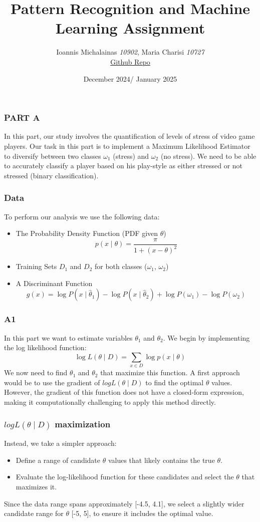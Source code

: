 \documentclass{beamer}
\title{Pattern Recognition and Machine Learning Assignment}
\author{Ioannis Michalainas \textit{10902}, Maria Charisi \textit{10727}\\
    \href{https://github.com/ioannisam/PR-ML}{Github Repo}
}
\date{December 2024/ January 2025}
\begin{document}
\frame{\titlepage}

\begin{frame}


\frametitle{PART A}
In this part, our study involves the quantification of levels of stress of video game players. Our task in this part is to implement a Maximum Likelihood Estimator to diversify between two classes $\omega_1$ (stress) and $\omega_2$ (no stress). We need to be able to accurately classify a player based on his play-style as either stressed or not stressed (binary classification).

\end{frame}

\begin{frame}
\frametitle{Data}

To perform our analysis we use the following data: 
\begin{itemize}
    \item The Probability Density Function (PDF given $\theta$)$$ p(x \mid \theta) = \frac{\pi}{1 + (x - \theta)^2} $$
    \item Training Sets $D_1$ and $D_2$ for both classes ($\omega_1$, $\omega_2$)
    \item A Discriminant Function $$ g(x) = \log P(x \mid \hat{\theta}_1) - \log P(x \mid \hat{\theta}_2) + \log P(\omega_1) - \log P(\omega_2) $$
\end{itemize}
\end{frame}

\begin{frame}
\frametitle{A1}
In this part we want to estimate variables $\theta_1$ and $\theta_2$.
We begin by implementing the log likelihood function:
$$
\log L(\theta \mid D) = \sum_{x \in D} \log p(x \mid \theta)
$$
We now need to find $\theta_1$ and $\theta_2$ that maximize this function. A first approach would be to use the gradient of $log L(\theta \mid D)$ to find the optimal $\theta$ values. However, the gradient of this function does not have a closed-form expression, making it computationally challenging to apply this method directly.
\end{frame}

\begin{frame}
\frametitle{$log L(\theta \mid D)$ maximization}
Instead, we take a simpler approach:
\begin{itemize}
    \item Define a range of candidate $\theta$ values that likely contains the true $\theta$.
    \item Evaluate the log-likelihood function for these candidates and select the $\theta$ that maximizes it.
\end{itemize}
Since the data range spans approximately [-4.5, 4.1], we select a slightly wider candidate range for $\theta$ [-5, 5], to ensure it includes the optimal value.
\end{frame}
\end{document}
